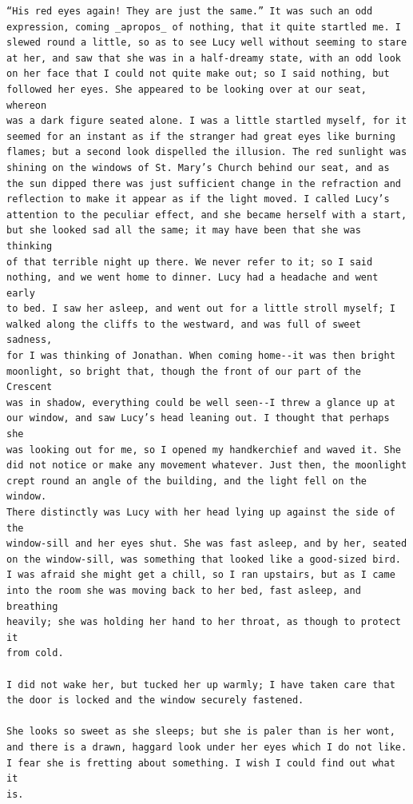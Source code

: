 \documentclass{article}
\begin{document}
\begin{verbatim}
“His red eyes again! They are just the same.” It was such an odd
expression, coming _apropos_ of nothing, that it quite startled me. I
slewed round a little, so as to see Lucy well without seeming to stare
at her, and saw that she was in a half-dreamy state, with an odd look
on her face that I could not quite make out; so I said nothing, but
followed her eyes. She appeared to be looking over at our seat, whereon
was a dark figure seated alone. I was a little startled myself, for it
seemed for an instant as if the stranger had great eyes like burning
flames; but a second look dispelled the illusion. The red sunlight was
shining on the windows of St. Mary’s Church behind our seat, and as
the sun dipped there was just sufficient change in the refraction and
reflection to make it appear as if the light moved. I called Lucy’s
attention to the peculiar effect, and she became herself with a start,
but she looked sad all the same; it may have been that she was thinking
of that terrible night up there. We never refer to it; so I said
nothing, and we went home to dinner. Lucy had a headache and went early
to bed. I saw her asleep, and went out for a little stroll myself; I
walked along the cliffs to the westward, and was full of sweet sadness,
for I was thinking of Jonathan. When coming home--it was then bright
moonlight, so bright that, though the front of our part of the Crescent
was in shadow, everything could be well seen--I threw a glance up at
our window, and saw Lucy’s head leaning out. I thought that perhaps she
was looking out for me, so I opened my handkerchief and waved it. She
did not notice or make any movement whatever. Just then, the moonlight
crept round an angle of the building, and the light fell on the window.
There distinctly was Lucy with her head lying up against the side of the
window-sill and her eyes shut. She was fast asleep, and by her, seated
on the window-sill, was something that looked like a good-sized bird.
I was afraid she might get a chill, so I ran upstairs, but as I came
into the room she was moving back to her bed, fast asleep, and breathing
heavily; she was holding her hand to her throat, as though to protect it
from cold.

I did not wake her, but tucked her up warmly; I have taken care that
the door is locked and the window securely fastened.

She looks so sweet as she sleeps; but she is paler than is her wont,
and there is a drawn, haggard look under her eyes which I do not like.
I fear she is fretting about something. I wish I could find out what it
is.


\end{verbatim}
\end{document}
